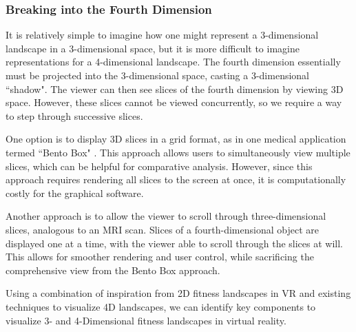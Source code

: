 \subsubsection{Breaking into the Fourth Dimension}

It is relatively simple to imagine how one might represent a 3-dimensional landscape in a 3-dimensional space, but it is more difficult to imagine representations for a 4-dimensional landscape. 
The fourth dimension essentially must be projected into the 3-dimensional space, casting a 3-dimensional ``shadow". 
The viewer can then see slices of the fourth dimension by viewing 3D space. 
However, these slices cannot be viewed concurrently, so we require a way to step through successive slices. 

One option is to display 3D slices in a grid format, as in one medical application termed ``Bento Box" \citep{johnson_bento_2019}. 
This approach allows users to simultaneously view multiple slices, which can be helpful for comparative analysis. 
However, since this approach requires rendering all slices to the screen at once, it is computationally costly for the graphical software.

Another approach is to allow the viewer to scroll through three-dimensional slices, analogous to an MRI scan. 
Slices of a fourth-dimensional object are displayed one at a time, with the viewer able to scroll through the slices at will.
This allows for smoother rendering and user control, while sacrificing the comprehensive view from the Bento Box approach. 

Using a combination of inspiration from 2D fitness landscapes in VR and existing techniques to visualize 4D landscapes, we can identify key components to visualize 3- and 4-Dimensional fitness landscapes in virtual reality. 